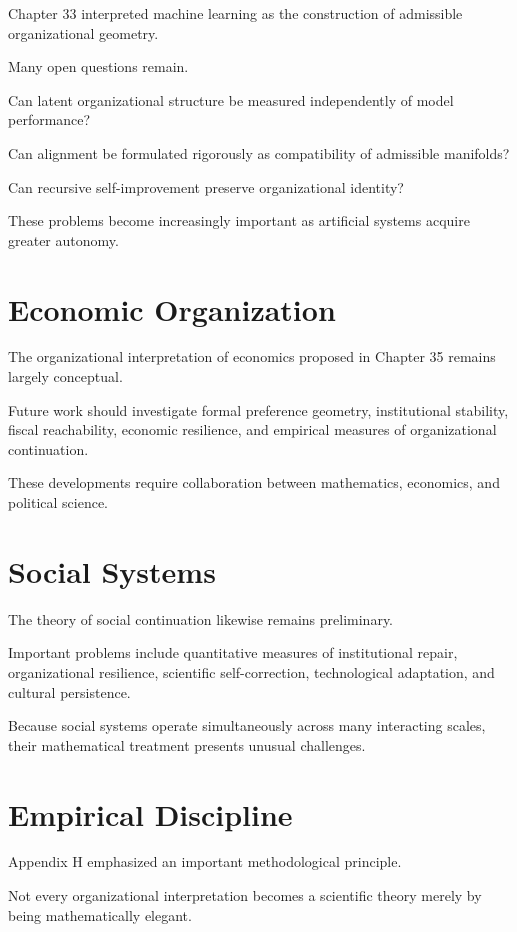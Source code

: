 \documentclass[11pt,oneside]{book}
\numberwithin{equation}{chapter}
\theoremstyle{definition}
\theoremstyle{plain}
\begin{document}
Chapter 33 interpreted machine learning as the construction of admissible
organizational geometry.

Many open questions remain.

Can latent organizational structure be measured independently of model
performance?

Can alignment be formulated rigorously as compatibility of admissible
manifolds?

Can recursive self-improvement preserve organizational identity?

These problems become increasingly important as artificial systems acquire
greater autonomy.

\section{Economic Organization}

The organizational interpretation of economics proposed in Chapter 35
remains largely conceptual.

Future work should investigate formal preference geometry, institutional
stability, fiscal reachability, economic resilience, and empirical
measures of organizational continuation.

These developments require collaboration between mathematics, economics,
and political science.

\section{Social Systems}

The theory of social continuation likewise remains preliminary.

Important problems include quantitative measures of institutional repair,
organizational resilience, scientific self-correction, technological
adaptation, and cultural persistence.

Because social systems operate simultaneously across many interacting
scales, their mathematical treatment presents unusual challenges.

\section{Empirical Discipline}

Appendix H emphasized an important methodological principle.

Not every organizational interpretation becomes a scientific theory merely
by being mathematically elegant.
\end{document}
